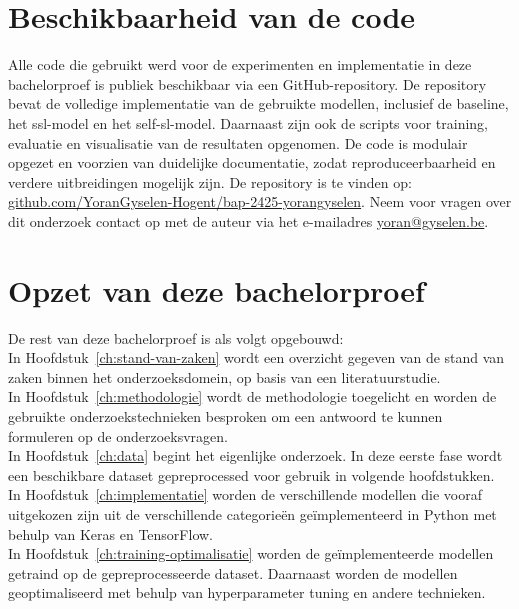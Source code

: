 \section{Beschikbaarheid van de code}

Alle code die gebruikt werd voor de experimenten en implementatie in deze bachelorproef is publiek beschikbaar via een GitHub-repository. De repository bevat de volledige implementatie van de gebruikte modellen, inclusief de baseline, het \gls{ssl}-model en het \gls{self-sl}-model. Daarnaast zijn ook de scripts voor training, evaluatie en visualisatie van de resultaten opgenomen. De code is modulair opgezet en voorzien van duidelijke documentatie, zodat reproduceerbaarheid en verdere uitbreidingen mogelijk zijn. De repository is te vinden op: \href{https://github.com/YoranGyselen-Hogent/bap-2425-yorangyselen}{github.com/YoranGyselen-Hogent/bap-2425-yorangyselen}. Neem voor vragen over dit onderzoek contact op met de auteur via het e-mailadres \href{mailto:yoran@gyselen.be}{yoran@gyselen.be}.

\section{Opzet van deze bachelorproef}%
\label{sec:opzet-bachelorproef}

De rest van deze bachelorproef is als volgt opgebouwd: \\

In Hoofdstuk~\ref{ch:stand-van-zaken} wordt een overzicht gegeven van de stand van zaken binnen het onderzoeksdomein, op basis van een literatuurstudie. \\

In Hoofdstuk~\ref{ch:methodologie} wordt de methodologie toegelicht en worden de gebruikte onderzoekstechnieken besproken om een antwoord te kunnen formuleren op de onderzoeksvragen. \\

In Hoofdstuk~\ref{ch:data} begint het eigenlijke onderzoek. In deze eerste fase wordt een beschikbare dataset gepreprocessed voor gebruik in volgende hoofdstukken. \\

In Hoofdstuk~\ref{ch:implementatie} worden de verschillende modellen die vooraf uitgekozen zijn uit de verschillende categorieën geïmplementeerd in Python met behulp van Keras en TensorFlow. \\

In Hoofdstuk~\ref{ch:training-optimalisatie} worden de geïmplementeerde modellen getraind op de gepreprocesseerde dataset. Daarnaast worden de modellen geoptimaliseerd met behulp van hyperparameter tuning en andere technieken. \\

